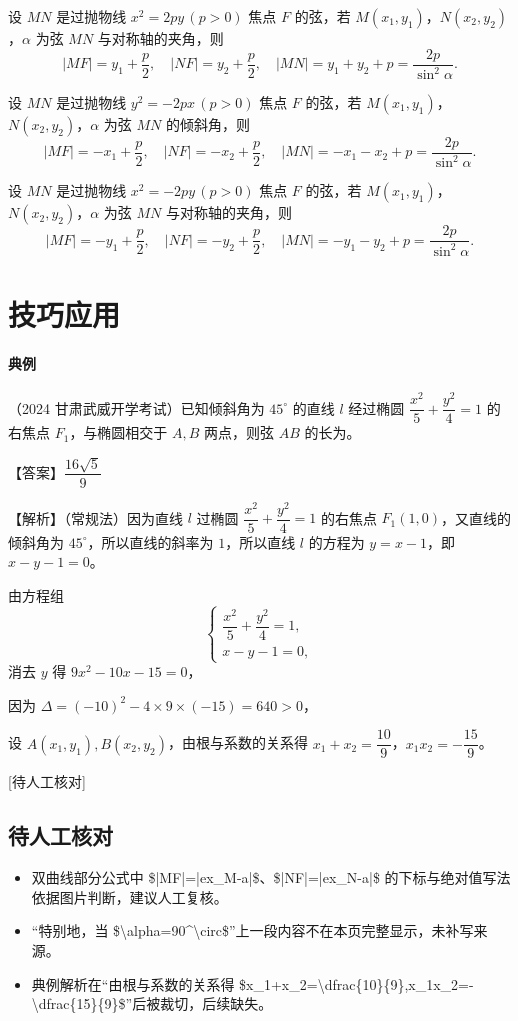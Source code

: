 \documentclass[UTF8,a4paper,11pt]{ctexart}
\begin{document}
设 $MN$ 是过抛物线 $x^2=2py\,(p>0)$ 焦点 $F$ 的弦，若 $M(x_1,y_1)$，$N(x_2,y_2)$，$\alpha$ 为弦 $MN$ 与对称轴的夹角，则
\[
|MF|=y_1+\frac{p}{2},\quad |NF|=y_2+\frac{p}{2},\quad |MN|=y_1+y_2+p=\frac{2p}{\sin^2\alpha}.
\]

设 $MN$ 是过抛物线 $y^2=-2px\,(p>0)$ 焦点 $F$ 的弦，若 $M(x_1,y_1)$，$N(x_2,y_2)$，$\alpha$ 为弦 $MN$ 的倾斜角，则
\[
|MF|=-x_1+\frac{p}{2},\quad |NF|=-x_2+\frac{p}{2},\quad |MN|=-x_1-x_2+p=\frac{2p}{\sin^2\alpha}.
\]

设 $MN$ 是过抛物线 $x^2=-2py\,(p>0)$ 焦点 $F$ 的弦，若 $M(x_1,y_1)$，$N(x_2,y_2)$，$\alpha$ 为弦 $MN$ 与对称轴的夹角，则
\[
|MF|=-y_1+\frac{p}{2},\quad |NF|=-y_2+\frac{p}{2},\quad |MN|=-y_1-y_2+p=\frac{2p}{\sin^2\alpha}.
\]

\section*{技巧应用}

\paragraph{典例}（2024 甘肃武威开学考试）已知倾斜角为 $45^\circ$ 的直线 $l$ 经过椭圆 $\dfrac{x^2}{5}+\dfrac{y^2}{4}=1$ 的右焦点 $F_1$，与椭圆相交于 $A,B$ 两点，则弦 $AB$ 的长为\underline{\qquad\qquad}。

【答案】$\dfrac{16\sqrt{5}}{9}$

【解析】（常规法）因为直线 $l$ 过椭圆 $\dfrac{x^2}{5}+\dfrac{y^2}{4}=1$ 的右焦点 $F_1(1,0)$，又直线的倾斜角为 $45^\circ$，所以直线的斜率为 $1$，所以直线 $l$ 的方程为 $y=x-1$，即 $x-y-1=0$。

由方程组
\[
\begin{cases}
\dfrac{x^2}{5}+\dfrac{y^2}{4}=1,\\
x-y-1=0,
\end{cases}
\]
消去 $y$ 得 $9x^2-10x-15=0$，

因为 $\Delta=(-10)^2-4\times 9\times(-15)=640>0$，

设 $A(x_1,y_1),B(x_2,y_2)$，由根与系数的关系得 $x_1+x_2=\dfrac{10}{9}$，$x_1x_2=-\dfrac{15}{9}$。

[待人工核对]

\subsection*{待人工核对}

\begin{itemize}

\item 双曲线部分公式中 \$|MF|=|ex\_M-a|\$、\$|NF|=|ex\_N-a|\$ 的下标与绝对值写法依据图片判断，建议人工复核。

\item “特别地，当 \$\textbackslash{}alpha=90\textasciicircum{}\textbackslash{}circ\$”上一段内容不在本页完整显示，未补写来源。

\item 典例解析在“由根与系数的关系得 \$x\_1+x\_2=\textbackslash{}dfrac\{10\}\{9\},x\_1x\_2=-\textbackslash{}dfrac\{15\}\{9\}\$”后被裁切，后续缺失。

\end{itemize}
\end{document}
